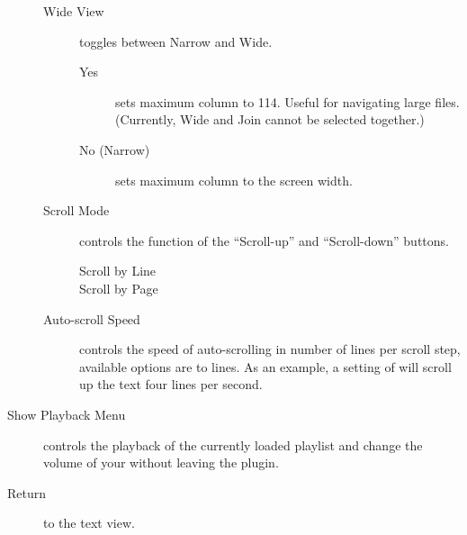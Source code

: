\begin{description}
\begin{description}
\begin{description}
        \end{description}
    \item[Wide View] toggles between Narrow and Wide.
        \begin{description}
            \item[Yes] sets maximum column to 114. Useful for navigating large files.
            (Currently, Wide and Join cannot be selected together.)
            \item[No (Narrow)] sets maximum column to the screen width.
        \end{description}
    \item[Scroll Mode] controls the function of the ``Scroll-up'' and
    ``Scroll-down'' buttons.
        \begin{description}
            \item[Scroll by Line]
            \item[Scroll by Page]
        \end{description}
    \item[Auto-scroll Speed]
    controls the speed of auto-scrolling in number of lines per scroll step,
    available options are  to  lines. As an example,
    a setting of  will scroll up the text four lines per second.
    \end{description}

\item[Show Playback Menu] controls the playback of the currently loaded playlist
and change the volume of your \dap without leaving the plugin.
\item[Return] to the text view.
\end{description}


